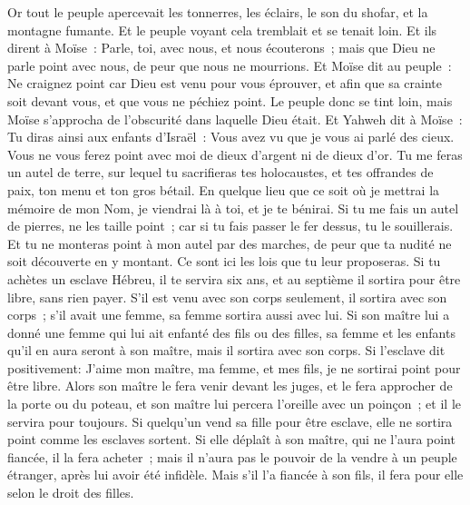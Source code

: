 \begin{multicols}{2}
Or tout le peuple apercevait les tonnerres, les éclairs, le son du shofar, et la montagne fumante. Et le peuple voyant cela tremblait et se tenait loin.
Et ils dirent à Moïse~: Parle, toi, avec nous, et nous écouterons~; mais que Dieu ne parle point avec nous, de peur que nous ne mourrions.
Et Moïse dit au peuple~: Ne craignez point car Dieu est venu pour vous éprouver, et afin que sa crainte soit devant vous, et que vous ne péchiez point.
Le peuple donc se tint loin, mais Moïse s'approcha de l'obscurité dans laquelle Dieu était.
Et Yahweh dit à Moïse~: Tu diras ainsi aux enfants d'Israël~: Vous avez vu que je vous ai parlé des cieux.
Vous ne vous ferez point avec moi de dieux d'argent ni de dieux d'or.
Tu me feras un autel de terre, sur lequel tu sacrifieras tes holocaustes, et tes offrandes de paix, ton menu et ton gros bétail. En quelque lieu que ce soit où je mettrai la mémoire de mon Nom, je viendrai là à toi, et je te bénirai.
Si tu me fais un autel de pierres, ne les taille point~; car si tu fais passer le fer dessus, tu le souillerais.
Et tu ne monteras point à mon autel par des marches, de peur que ta nudité ne soit découverte en y montant.
\VerseOne{}Ce sont ici les lois que tu leur proposeras.
Si tu achètes un esclave Hébreu, il te servira six ans, et au septième il sortira pour être libre, sans rien payer.
S'il est venu avec son corps seulement, il sortira avec son corps~; s'il avait une femme, sa femme sortira aussi avec lui.
Si son maître lui a donné une femme qui lui ait enfanté des fils ou des filles, sa femme et les enfants qu'il en aura seront à son maître, mais il sortira avec son corps.
Si l'esclave dit positivement: J'aime mon maître, ma femme, et mes fils, je ne sortirai point pour être libre.
Alors son maître le fera venir devant les juges, et le fera approcher de la porte ou du poteau, et son maître lui percera l'oreille avec un poinçon~; et il le servira pour toujours.
Si quelqu'un vend sa fille pour être esclave, elle ne sortira point comme les esclaves sortent.
Si elle déplaît à son maître, qui ne l'aura point fiancée, il la fera acheter~; mais il n'aura pas le pouvoir de la vendre à un peuple étranger, après lui avoir été infidèle.
Mais s'il l'a fiancée à son fils, il fera pour elle selon le droit des filles.

\end{multicols}
